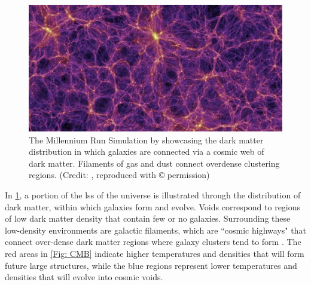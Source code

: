 \begin{figure}
    \centering
    \includegraphics[width=\linewidth]{Figures/galaxy_distribution.png}
    \caption{The Millennium Run Simulation by \cite{springel_simulations_2005} showcasing the dark matter distribution in which galaxies are connected via a cosmic web of dark matter. Filaments of gas and dust connect overdense clustering regions. (Credit: \citealp{springel_simulations_2005}, reproduced with © permission)}
    \label{Fig: Galaxy Distribution}
\end{figure}

In \cref{Fig: Galaxy Distribution}, a portion of the \gls{lss} of the universe is illustrated through the distribution of dark matter, within which galaxies form and evolve. Voids correspond to regions of low dark matter density that contain few or no galaxies. Surrounding these low-density environments are galactic filaments, which are ``cosmic highways" that connect over-dense dark matter regions where galaxy clusters tend to form \citep{darvish_cosmic_2014, okane_effect_2024}. The red areas in \cref{Fig: CMB} indicate higher temperatures and densities that will form future large structures, while the blue regions represent lower temperatures and densities that will evolve into cosmic voids.

